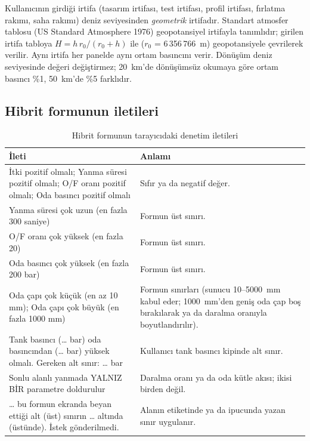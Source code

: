 \documentclass[11pt,a4paper]{article}
\newcommand{\ui}[1]{\textsf{#1}}
\begin{document}
Kullanıcının girdiği irtifa (tasarım irtifası, test irtifası, profil irtifası,
fırlatma rakımı, saha rakımı) deniz seviyesinden \emph{geometrik} irtifadır.
Standart atmosfer tablosu (US Standard Atmosphere 1976) geopotansiyel irtifayla
tanımlıdır; girilen irtifa tabloya $H = h\,r_0/(r_0 + h)$ ile ($r_0$ =
6\,356\,766~m) geopotansiyele çevrilerek verilir. Aynı irtifa her panelde aynı
ortam basıncını verir. Dönüşüm deniz seviyesinde değeri değiştirmez; 20~km'de
dönüşümsüz okumaya göre ortam basıncı \%1, 50~km'de \%5 farklıdır.

\subsection{Hibrit formunun iletileri}

\begin{table}[htbp]
\centering\small
\caption{Hibrit formunun tarayıcıdaki denetim iletileri}\label{tab:formileti}
\begin{tabular}{@{}>{\raggedright\arraybackslash}p{8.0cm}>{\raggedright\arraybackslash}p{7.6cm}@{}}
\toprule
\textbf{İleti} & \textbf{Anlamı} \\
\midrule
\ui{İtki pozitif olmalı}; \ui{Yanma süresi pozitif olmalı}; \ui{O/F oranı pozitif olmalı}; \ui{Oda basıncı pozitif olmalı} & Sıfır ya da negatif değer. \\
\ui{Yanma süresi çok uzun (en fazla 300 saniye)} & Formun üst sınırı. \\
\ui{O/F oranı çok yüksek (en fazla 20)} & Formun üst sınırı. \\
\ui{Oda basıncı çok yüksek (en fazla 200 bar)} & Formun üst sınırı. \\
\ui{Oda çapı çok küçük (en az 10 mm)}; \ui{Oda çapı çok büyük (en fazla 1000 mm)} & Formun sınırları (sunucu 10--5000~mm kabul eder; 1000~mm'den geniş oda çap boş bırakılarak ya da daralma oranıyla boyutlandırılır). \\
\ui{Tank basıncı (\ldots{} bar) oda basıncından (\ldots{} bar) yüksek olmalı. Gereken alt sınır: \ldots{} bar} & Kullanıcı tank basıncı kipinde alt sınır. \\
\ui{Sonlu alanlı yanmada YALNIZ BİR parametre doldurulur} & Daralma oranı ya da oda kütle akısı; ikisi birden değil. \\
\ui{\ldots{} bu formun ekranda beyan ettiği alt (üst) sınırın \ldots{} altında (üstünde). İstek gönderilmedi.} & Alanın etiketinde ya da ipucunda yazan sınır uygulanır. \\
\bottomrule
\end{tabular}
\end{table}
\end{document}

